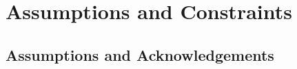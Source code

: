 \documentclass[12pt]{article} %
\begin{document}
		
	
	
	
	
	
	
	
	

	

	
	\section{Assumptions and Constraints}
	
\subsection{Assumptions and Acknowledgements}
\end{document}
